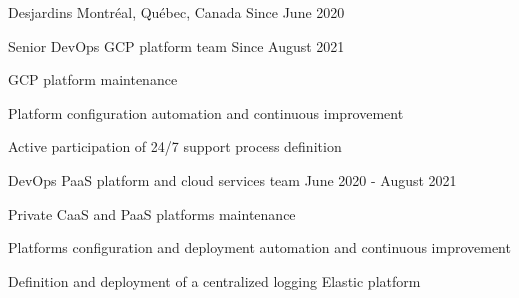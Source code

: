 

\begin{cventries}

  \cventry
    {} %
    {Desjardins} %
    {Montréal, Québec, Canada} %
    {Since June 2020} %
    {
      \begin{cvsubentries}
        \cvsubentry
          {Senior DevOps}
          {GCP platform team}
          {Since August 2021}
          {
            \begin{cvitems} %
              \item {GCP platform maintenance}
              \item {Platform configuration automation and continuous improvement}
              \item {Active participation of 24/7 support process definition}
            \end{cvitems}
          }
        \cvsubentry
          {DevOps}
          {PaaS platform and cloud services team}
          {June 2020 - August 2021}
          {
            \begin{cvitems} %
              \item {Private CaaS and PaaS platforms maintenance}
              \item {Platforms configuration and deployment automation and continuous improvement}
              \item {Definition and deployment of a centralized logging Elastic platform}
            \end{cvitems}
          }
      \end{cvsubentries}
    }


\end{cventries}
